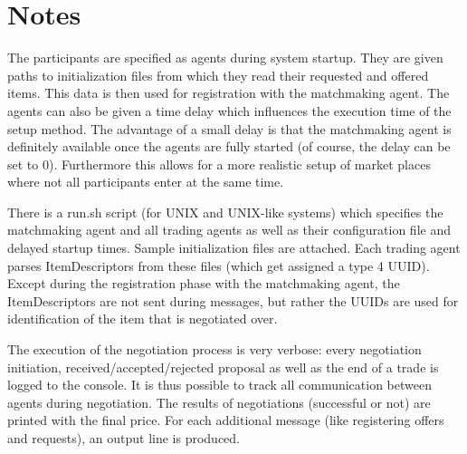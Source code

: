 \documentclass[a4paper,11pt]{article}
\begin{document}
\section{Notes}
The participants are specified as agents during system startup. They are given paths to initialization files from which they read their requested and offered items. This data is then used for registration with the matchmaking agent. The agents can also be given a time delay which influences the execution time of the setup method. The advantage of a small delay is that the matchmaking agent is definitely available once the agents are fully started (of course, the delay can be set to 0). Furthermore this allows for a more realistic setup of market places where not all participants enter at the same time.

There is a run.sh script (for UNIX and UNIX-like systems) which specifies the matchmaking agent and all trading agents as well as their configuration file and delayed startup times. Sample initialization files are attached. Each trading agent parses ItemDescriptors from these files (which get assigned a type 4 UUID). Except during the registration phase with the matchmaking agent, the ItemDescriptors are not sent during messages, but rather the UUIDs are used for identification of the item that is negotiated over.

The execution of the negotiation process is very verbose: every negotiation initiation, received/accepted/rejected proposal as well as the end of a trade is logged to the console. It is thus possible to track all communication between agents during negotiation. The results of negotiations (successful or not) are printed with the final price. For each additional message (like registering offers and requests), an output line is produced.
\end{document}
